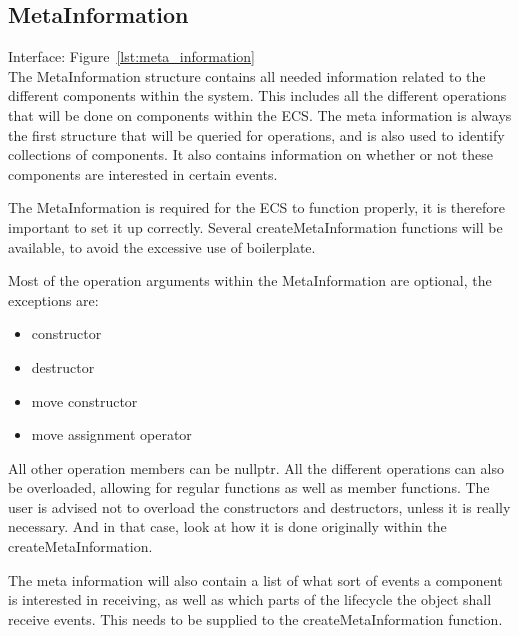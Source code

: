 \subsection{MetaInformation}
Interface: Figure~\ref{lst:meta_information}\\\noindent
The MetaInformation structure contains all needed information related to the different components within the system.
This includes all the different operations that will be done on components within the ECS.
The meta information is always the first structure that will be queried for operations, and is also used to identify collections of components.
It also contains information on whether or not these components are interested in certain events. 

The MetaInformation is required for the ECS to function properly, it is therefore important to set it up correctly.
Several createMetaInformation functions will be available, to avoid the excessive use of boilerplate.

Most of the operation arguments within the MetaInformation are optional, the exceptions are:
\begin{itemize}
    \item constructor
    \item destructor
    \item move constructor
    \item move assignment operator
\end{itemize}
All other operation members can be nullptr. All the different operations can also be overloaded, 
allowing for regular functions as well as member functions.
The user is advised not to overload the constructors and destructors, unless it is really necessary.
And in that case, look at how it is done originally within the createMetaInformation.

The meta information will also contain a list of what sort of events a component is interested in receiving, 
as well as which parts of the lifecycle the object shall receive events.
This needs to be supplied to the createMetaInformation function.
